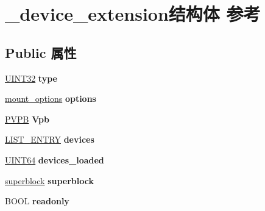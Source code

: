\hypertarget{struct__device__extension}{}\section{\+\_\+device\+\_\+extension结构体 参考}
\label{struct__device__extension}
\subsection*{Public 属性}
\begin{DoxyCompactItemize}
\item 
\mbox{\label{struct__device__extension_a59243a50b55aded4c7a77929782ab3bf}} 
\hyperlink{_processor_bind_8h_ae1e6edbbc26d6fbc71a90190d0266018}{U\+I\+N\+T32} {\bfseries type}
\item 
\mbox{\label{struct__device__extension_a2da109845d22b532aac7e6b37f814ac1}} 
\hyperlink{structmount__options}{mount\+\_\+options} {\bfseries options}
\item 
\mbox{\label{struct__device__extension_af12cd1d2e40c5ee360fe02ef9cf44c90}} 
\hyperlink{struct___v_p_b}{P\+V\+PB} {\bfseries Vpb}
\item 
\mbox{\label{struct__device__extension_a1e1b9684c7cf2ed8f666fae7a74e3c20}} 
\hyperlink{struct___l_i_s_t___e_n_t_r_y}{L\+I\+S\+T\+\_\+\+E\+N\+T\+RY} {\bfseries devices}
\item 
\mbox{\label{struct__device__extension_ab6eb762e37174440fbb0cedfd841acde}} 
\hyperlink{_processor_bind_8h_a57be03562867144161c1bfee95ca8f7c}{U\+I\+N\+T64} {\bfseries devices\+\_\+loaded}
\item 
\mbox{\label{struct__device__extension_a670c132f9236c555a615f908f2d585c5}} 
\hyperlink{structsuperblock}{superblock} {\bfseries superblock}
\item 
\mbox{\label{struct__device__extension_a41e8f7fe6861311be12e435b4a4c3492}} 
B\+O\+OL {\bfseries readonly}
\item 
\mbox{\label{struct__device__extension_a45943e902f542e43aba68d46123edd9e}} 

\end{DoxyCompactItemize}

